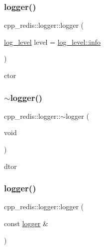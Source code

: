 \subsubsection{\texorpdfstring{logger()}{logger()}\hspace{0.1cm}{\footnotesize\ttfamily [1/2]}}
{\footnotesize\ttfamily cpp\+\_\+redis\+::logger\+::logger (\begin{DoxyParamCaption}\item[{\hyperlink{classcpp__redis_1_1logger_a9493594d547e7abe71b8690be1946c7a}{log\+\_\+level}}]{level = {\ttfamily \hyperlink{classcpp__redis_1_1logger_a9493594d547e7abe71b8690be1946c7aacaf9b6b99962bf5c2264824231d7a40c}{log\+\_\+level\+::info}} }\end{DoxyParamCaption})}



ctor 

\mbox{\label{classcpp__redis_1_1logger_ab5eb02b26c96a6e5cba9a7d30669f625}} 
\subsubsection{\texorpdfstring{$\sim$logger()}{~logger()}}
{\footnotesize\ttfamily cpp\+\_\+redis\+::logger\+::$\sim$logger (\begin{DoxyParamCaption}\item[{void}]{ }\end{DoxyParamCaption})\hspace{0.3cm}{\ttfamily [default]}}



dtor 

\mbox{\label{classcpp__redis_1_1logger_aec0854d47a13f91e09db25e745a3d722}} 
\subsubsection{\texorpdfstring{logger()}{logger()}\hspace{0.1cm}{\footnotesize\ttfamily [2/2]}}
{\footnotesize\ttfamily cpp\+\_\+redis\+::logger\+::logger (\begin{DoxyParamCaption}\item[{const \hyperlink{classcpp__redis_1_1logger}{logger} \&}]{ }\end{DoxyParamCaption})\hspace{0.3cm}{\ttfamily [default]}}



